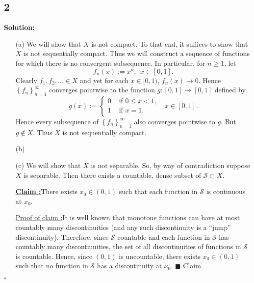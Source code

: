 \documentclass[12pt]{article}
\newcounter{ProofCounter}
\newcounter{ClaimCounter}[ProofCounter]
\newenvironment{Solution}{\stepcounter{ProofCounter}\textbf{Solution:}}{\hfill$\square$}
\newenvironment{claim}[1]{\vspace{1mm}\stepcounter{ClaimCounter}\par\noindent\underline{\bf Claim \theClaimCounter:}\space#1}{}
\newenvironment{claimproof}[1]{\par\noindent\underline{Proof of claim \theClaimCounter:}\space#1}{\hfill $\blacksquare$ Claim \theClaimCounter}
\begin{document}
\subsection*{2}
\begin{Solution}
  \begin{enumerate}
    \item[(a)] We will show that $X$ is not compact. To that end, it suffices to show that $X$ is not sequentially compact. Thus we will construct a
      sequence of functions for which there is no convergent subsequence. In particular, for $n \geq 1$, let 
      \[
        f_n(x) := x^n, \ \ x \in [0,1].
      \]
      Clearly $f_1, f_2, \dots \in X$ and yet for each $x \in [0,1)$, $f_n(x) \rightarrow 0$. Hence $\left\{ f_n \right\}_{n=1}^{\infty}$ converges
      pointwise to the function $g : [0,1] \rightarrow [0,1]$ defined by
      \[
        g(x) := \left\{ \begin{array}{cl}
            0 & \text{ if } 0 \leq x < 1, \\
            1 & \text{ if } x = 1,
          \end{array}
        \right. \ \ \ x \in [0,1].
      \]
      Hence every subsequence of $\left\{ f_n \right\}_{n=1}^{\infty}$ also converges pointwise to $g$. But $g \notin X$. Thus $X$ is not
      sequentially compact.

    \item[(b)] 
    \item[(c)] We will show that $X$ is not separable. So, by way of contradiction suppose $X$ is separable. Then there exists a countable, dense
      subset of $\mathcal{S} \subset X$. 

      \begin{claim}
        There exists $x_0 \in (0,1)$ such that each function in $\mathcal{S}$ is continuous at $x_0$.
      \end{claim}
      \begin{claimproof}
        It is well known that monotone functions can have at most countably many discontinuities (and any such
        discontinuity is a ``jump'' discontinuity). Therefore, since $\mathcal{S}$ countable and each function in $\mathcal{S}$ has countably many
        discontinuities, the set of all discontinuities of functions in $\mathcal{S}$ is countable. Hence, since $(0,1)$ is uncountable, there
        exists $x_0 \in (0,1)$ such that no function in $\mathcal{S}$ has a discontinuity at $x_0$.
      \end{claimproof}


\end{enumerate}
\end{Solution}
\end{document}
